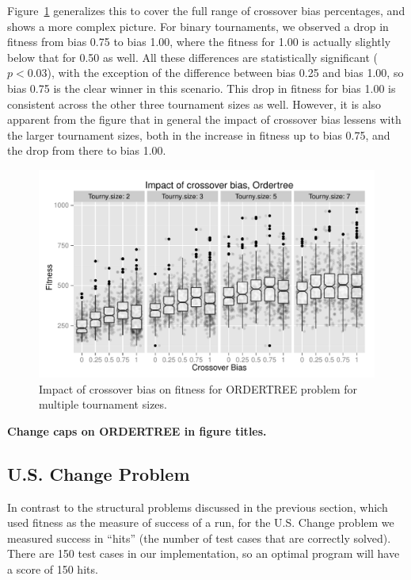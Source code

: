 \documentclass{sig-alternate}
\begin{document}
Figure~\ref{fig:Ordertree_results_all_tournaments_Jan15} generalizes this to cover the full range of crossover bias
percentages, and shows a more complex picture. For binary tournaments, we observed a drop in fitness from bias 0.75 to
bias 1.00, where the fitness for 1.00 is actually slightly below that for 0.50 as well. All these differences are
statistically significant ($p < 0.03$), with the exception of the difference between bias 0.25 and bias 1.00, so bias
0.75 is the clear winner in this scenario. This drop in fitness for bias 1.00 is consistent across the other three
tournament sizes as well. However, it is also apparent from the figure that in general the impact of crossover bias
lessens with the larger tournament sizes, both in the increase in fitness up to bias 0.75, and the drop from there to
bias 1.00.

\begin{figure}
\centering
\includegraphics[width=0.45 \textwidth]{Plots/Ordertree_results_all_tournaments_Jan15.pdf}
\caption{Impact of crossover bias on fitness for ORDERTREE problem for multiple tournament sizes.}
\label{fig:Ordertree_results_all_tournaments_Jan15}
\end{figure}

\textbf{Change caps on ORDERTREE in figure titles.}

%
%
%
%

\subsection{U.S. Change Problem} \label{sec:USChange}

In contrast to the structural problems discussed in the previous section, which used fitness as the measure of success
of a run, for the U.S. Change problem we measured success in ``hits'' (the number of test cases that are correctly
solved). There are 150 test cases in our implementation, so an optimal program will have a score of 150 hits.
\end{document}
